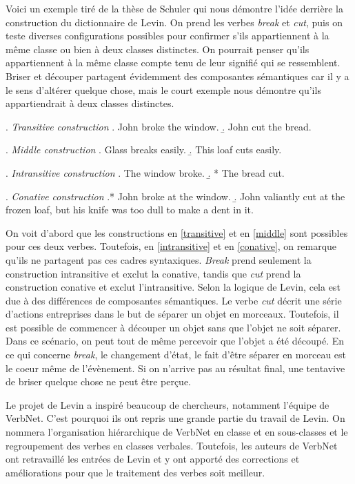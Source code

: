Voici un exemple tiré de la thèse de Schuler \citep{SchulerVerbnetBroadcoverageComprehensive2005} qui nous démontre l'idée derrière la construction du dictionnaire de Levin. On prend les verbes \emph{break} et \emph{cut}, puis on teste diverses configurations possibles pour confirmer s'ils appartiennent à la même classe ou bien à deux classes distinctes. On pourrait penser qu'ils appartiennent à la même classe compte tenu de leur signifié qui se ressemblent. Briser et découper partagent évidemment des composantes sémantiques car il y a le sens d'altérer quelque chose, mais le court exemple nous démontre qu'ils appartiendrait à deux classes distinctes.

\ex. \label{transitive} \emph{Transitive construction}
	\a. John broke the window.
	\b. John cut the bread.
	
\ex. \label{middle} \emph{Middle construction}
	\a. Glass breaks easily.
	\b. This loaf cuts easily.
	
\ex. \label{intransitive} \emph{Intransitive construction}
	\a. The window broke.
	\b. * The bread cut.

\ex. \label{conative} \emph{Conative construction}
	\a.* John broke at the window.
	\b. John valiantly cut at the frozen loaf, but his knife was too dull to make a dent in it.

On voit d'abord que les constructions en \ref{transitive} et en \ref{middle} sont possibles pour ces deux verbes. Toutefois, en \ref{intransitive} et en \ref{conative}, on remarque qu'ils ne partagent pas ces cadres syntaxiques. \emph{Break} prend seulement la construction intransitive et exclut la conative, tandis que \emph{cut} prend la construction conative et exclut l'intransitive. Selon la logique de Levin, cela est due à des différences de composantes sémantiques. Le verbe \emph{cut} décrit une série d'actions entreprises dans le but de séparer un objet en morceaux. Toutefois, il est possible de commencer à découper un objet sans que l'objet ne soit séparer. Dans ce scénario, on peut tout de même percevoir que l'objet a été découpé. En ce qui concerne \emph{break}, le changement d'état, le fait d'être séparer en morceau est le coeur même de l'évènement. Si on n'arrive pas au résultat final, une tentavive de briser quelque chose ne peut être perçue. 

Le projet de Levin a inspiré beaucoup de chercheurs, notamment l'équipe de VerbNet. C'est pourquoi ils ont repris une grande partie du travail de Levin. On nommera l'organisation hiérarchique de VerbNet en classe et en sous-classes et le regroupement des verbes en classes verbales. Toutefois, les auteurs de VerbNet ont retravaillé les entrées de Levin et y ont apporté des corrections et améliorations pour que le traitement des verbes soit meilleur\citep{verbnet.2006}.

